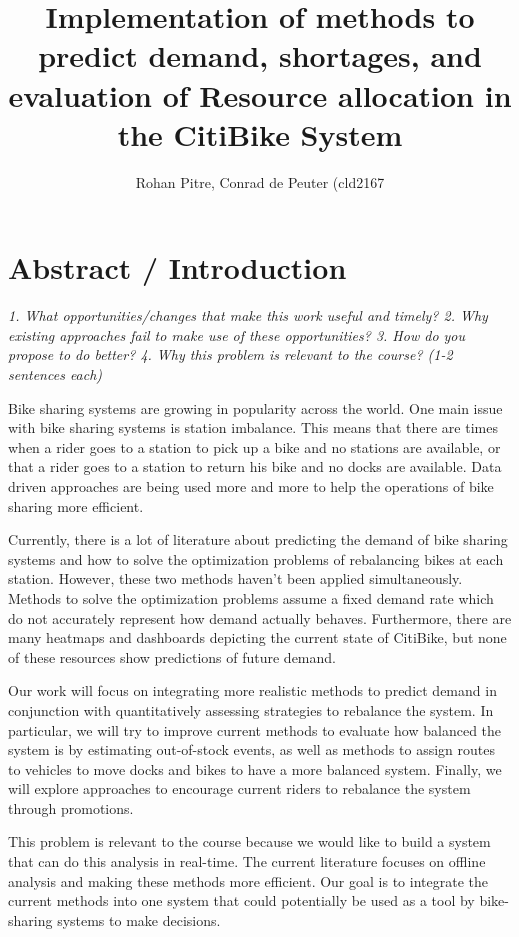 \documentclass{proc}
\begin{document}
\title{Implementation of methods to predict demand, shortages, and evaluation of Resource allocation in the CitiBike System}

\author{Rohan Pitre, Conrad de Peuter (cld2167}

\maketitle

\section{Abstract / Introduction}

\emph{1. What opportunities/changes that make this work useful and timely?
2. Why existing approaches fail to make use of these opportunities?
3. How do you propose to do better?
4. Why this problem is relevant to the course?
(1-2 sentences each)} 

Bike sharing systems are growing in popularity across the world. One main issue with bike sharing systems is station imbalance. This means that there are times when a rider goes to a station to pick up a bike and no stations are available, or that a rider goes to a station to return his bike and no docks are available. Data driven approaches are being used more and more to help the operations of bike sharing more efficient. 

Currently, there is a lot of literature about predicting the demand of bike sharing systems and how to solve the optimization problems of rebalancing bikes at each station. However, these two methods haven't been applied simultaneously. Methods to solve the optimization problems assume a fixed demand rate which do not accurately represent how demand actually behaves. Furthermore, there are many heatmaps and dashboards depicting the current state of CitiBike, but none of these resources show predictions of future demand.

Our work will focus on integrating more realistic methods to predict demand in conjunction with quantitatively assessing strategies to rebalance the system. In particular, we will try to improve current methods to evaluate how balanced the system is by estimating out-of-stock events, as well as methods to assign routes to vehicles to move docks and bikes to have a more balanced system. Finally, we will explore approaches to encourage current riders to rebalance the system through promotions.

This problem is relevant to the course because we would like to build a system that can do this analysis in real-time. The current literature focuses on offline analysis and making these methods more efficient. Our goal is to integrate the current methods into one system that could potentially be used as a tool by bike-sharing systems to make decisions. 
\end{document}
